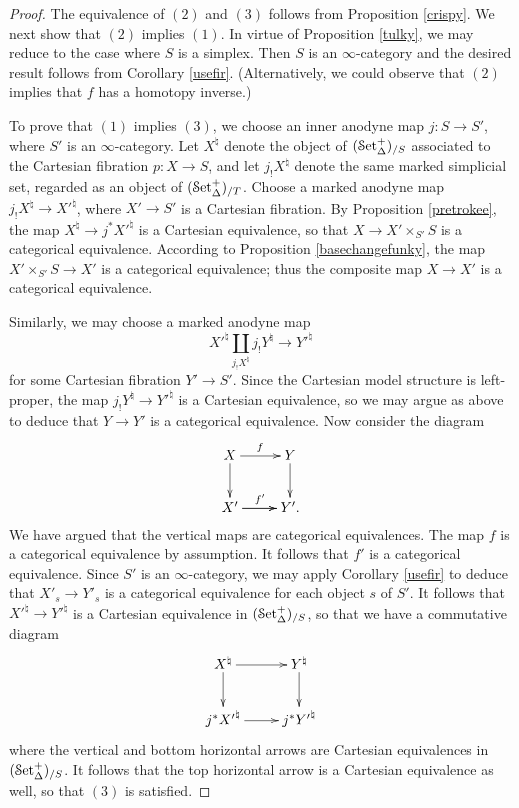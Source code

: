 \begin{proof}
The equivalence of $(2)$ and $(3)$ follows from Proposition \ref{crispy}. We next show that $(2)$ implies $(1)$. In virtue of Proposition \ref{tulky}, we may reduce to the case where $S$ is a simplex. Then $S$ is an $\infty$-category and the desired result follows from Corollary \ref{usefir}. (Alternatively, we could observe that $(2)$ implies that $f$ has a homotopy inverse.)

To prove that $(1)$ implies $(3)$, we choose an inner anodyne map $j: S \rightarrow S'$, where $S'$ is an $\infty$-category. Let $X^{\natural}$ denote the object of $(\operatorname{\mathcal{S}et_{\Delta}^{+}})_{/S}$ associated to the Cartesian fibration $p: X \rightarrow S$, and let $j_{!} X^{\natural}$ denote the same marked simplicial set, regarded as an object of $(\operatorname{\mathcal{S}et_{\Delta}^{+}})_{/T}$. Choose a marked anodyne map
$j_{!} X^{\natural} \rightarrow {X'}^{\natural}$, where $X' \rightarrow S'$ is a Cartesian fibration.
By Proposition \ref{pretrokee}, the map $X^{\natural} \rightarrow j^{\ast} {X'}^{\natural}$ is a Cartesian equivalence, so that $X \rightarrow X' \times_{S'} S$ is a categorical equivalence. According to Proposition \ref{basechangefunky}, the map $X' \times_{S'} S \rightarrow X'$ is a categorical equivalence; thus the composite map $X \rightarrow X'$ is a categorical equivalence.

Similarly, we may choose a marked anodyne map $${X'}^{\natural} \coprod_{ j_{!} X^{\natural}} j_{!} Y^{\natural} \rightarrow {Y'}^{\natural}$$ for some Cartesian fibration $Y' \rightarrow S'$. Since
the Cartesian model structure is left-proper, the map $j_{!} Y^{\natural} \rightarrow {Y'}^{\natural}$
is a Cartesian equivalence, so we may argue as above to deduce that $Y \rightarrow Y'$ is a categorical equivalence. Now consider the diagram
$$ \xymatrix{ X \ar[r]^{f} \ar[d] & Y \ar[d] \\
X' \ar[r]^{f'} \ar[r] & Y'. }$$
We have argued that the vertical maps are categorical equivalences. The map $f$ is a categorical equivalence by assumption. It follows that $f'$ is a categorical equivalence. Since $S'$ is an $\infty$-category, we may apply Corollary \ref{usefir} to deduce that $X'_{s} \rightarrow Y'_{s}$
is a categorical equivalence for each object $s$ of $S'$. It follows that ${X'}^{\natural}
\rightarrow {Y'}^{\natural}$ is a Cartesian equivalence in $(\operatorname{\mathcal{S}et_{\Delta}^{+}})_{/S}$, so that we have a commutative diagram
$$ \xymatrix{ X^{\natural} \ar[r] \ar[d] & Y^{\natural} \ar[d] \\
j^{\ast} {X'}^{\natural} \ar[r] & j^{\ast} {Y'}^{\natural} }$$
where the vertical and bottom horizontal arrows are Cartesian equivalences in $(\operatorname{\mathcal{S}et_{\Delta}^{+}})_{/S}$. It follows that the top horizontal arrow is a Cartesian equivalence as well, so that $(3)$ is satisfied.
\end{proof}



